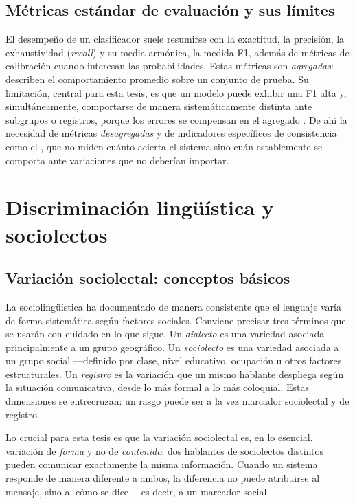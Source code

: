 \subsection{Métricas estándar de evaluación y sus límites}
\label{sec:metricas}

El desempeño de un clasificador suele resumirse con la exactitud, la precisión,
la exhaustividad (\emph{recall}) y su media armónica, la medida F1, además de
métricas de calibración cuando interesan las probabilidades. Estas métricas son
\emph{agregadas}: describen el comportamiento promedio sobre un conjunto de
prueba. Su limitación, central para esta tesis, es que un modelo puede exhibir
una F1 alta y, simultáneamente, comportarse de manera sistemáticamente distinta
ante subgrupos o registros, porque los errores se compensan en el agregado
\cite{Blodgett2020Survey, Mehrabi2021Survey}. De ahí la necesidad de métricas
\emph{desagregadas} y de indicadores específicos de consistencia como el \INS,
que no miden cuánto acierta el sistema sino cuán establemente se comporta ante
variaciones que no deberían importar.

\section{Discriminación lingüística y sociolectos}
\label{sec:sociolectos}

\subsection{Variación sociolectal: conceptos básicos}
\label{sec:variacion}

La sociolingüística ha documentado de manera consistente que el lenguaje varía
de forma sistemática según factores sociales. Conviene precisar tres términos
que se usarán con cuidado en lo que sigue. Un \emph{dialecto} es una variedad
asociada principalmente a un grupo geográfico. Un \emph{sociolecto} es una
variedad asociada a un grupo social ---definido por clase, nivel educativo,
ocupación u otros factores estructurales. Un \emph{registro} es la variación que
un mismo hablante despliega según la situación comunicativa, desde lo más formal
a lo más coloquial. Estas dimensiones se entrecruzan: un rasgo puede ser a la
vez marcador sociolectal y de registro.

Lo crucial para esta tesis es que la variación sociolectal es, en lo esencial,
variación de \emph{forma} y no de \emph{contenido}: dos hablantes de
sociolectos distintos pueden comunicar exactamente la misma información. Cuando
un sistema responde de manera diferente a ambos, la diferencia no puede
atribuirse al mensaje, sino al cómo se dice ---es decir, a un marcador social.


